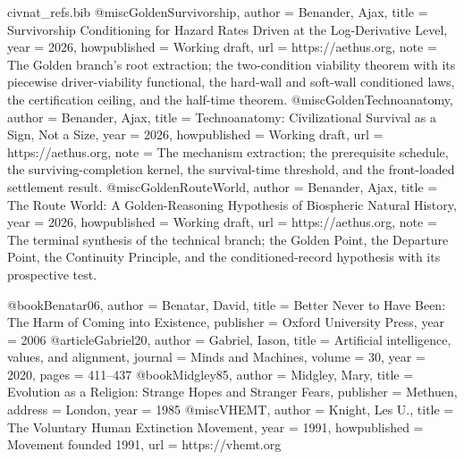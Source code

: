 \begin{filecontents}[overwrite]{civnat_refs.bib}
@misc{GoldenSurvivorship,
  author       = {Benander, Ajax},
  title        = {Survivorship Conditioning for Hazard Rates Driven at the Log-Derivative Level},
  year         = {2026},
  howpublished = {Working draft},
  url          = {https://aethus.org},
  note         = {The Golden branch's root extraction; the two-condition viability
                  theorem with its piecewise driver-viability functional, the
                  hard-wall and soft-wall conditioned laws, the certification
                  ceiling, and the half-time theorem.}
}
@misc{GoldenTechnoanatomy,
  author       = {Benander, Ajax},
  title        = {Technoanatomy: Civilizational Survival as a Sign, Not a Size},
  year         = {2026},
  howpublished = {Working draft},
  url          = {https://aethus.org},
  note         = {The mechanism extraction; the prerequisite schedule, the
                  surviving-completion kernel, the survival-time threshold, and the
                  front-loaded settlement result.}
}
@misc{GoldenRouteWorld,
  author       = {Benander, Ajax},
  title        = {The Route World: A Golden-Reasoning Hypothesis of Biospheric Natural History},
  year         = {2026},
  howpublished = {Working draft},
  url          = {https://aethus.org},
  note         = {The terminal synthesis of the technical branch; the Golden Point,
                  the Departure Point, the Continuity Principle, and the
                  conditioned-record hypothesis with its prospective test.}
}

@book{Benatar06,
  author    = {Benatar, David},
  title     = {Better Never to Have Been: The Harm of Coming into Existence},
  publisher = {Oxford University Press},
  year      = {2006}
}
@article{Gabriel20,
  author  = {Gabriel, Iason},
  title   = {Artificial intelligence, values, and alignment},
  journal = {Minds and Machines},
  volume  = {30},
  year    = {2020},
  pages   = {411--437}
}
@book{Midgley85,
  author    = {Midgley, Mary},
  title     = {Evolution as a Religion: Strange Hopes and Stranger Fears},
  publisher = {Methuen},
  address   = {London},
  year      = {1985}
}
@misc{VHEMT,
  author       = {Knight, Les U.},
  title        = {The Voluntary Human Extinction Movement},
  year         = {1991},
  howpublished = {Movement founded 1991},
  url          = {https://vhemt.org}
}
\end{filecontents}

